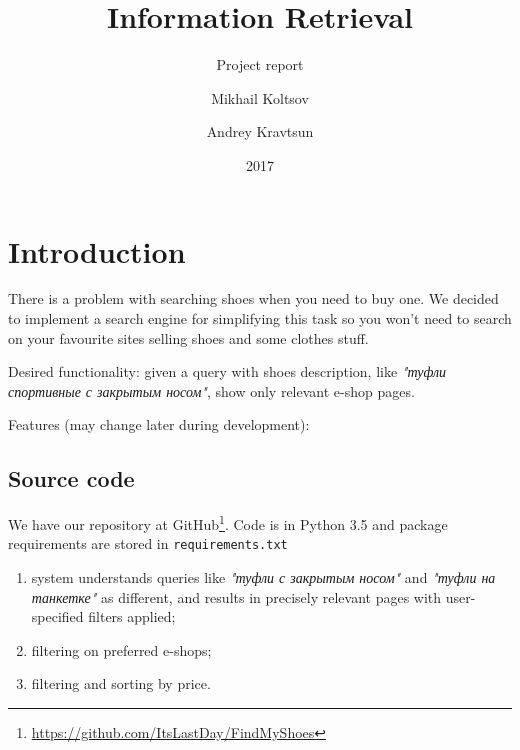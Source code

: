\documentclass[sigconf]{acmart}
\title{Information Retrieval}
\subtitle{Project report}
\author{Mikhail Koltsov}
\author{Andrey Kravtsun}
\date{2017}
\begin{document}
\maketitle

\section{Introduction}
There is a problem with searching shoes when you need to buy one. We decided to implement a search engine for sim\-pli\-fy\-ing this task so you won't need to search on your favourite sites selling shoes and some clothes stuff.

Desired functionality: given a query with shoes description, like \textit{"туфли спортивные с закрытым носом"}, show only re\-le\-vant e-shop pages.

Features (may change later during development):
\subsection{Source code}
    We have our repository at GitHub\footnote{\url{https://github.com/ItsLastDay/FindMyShoes}}. 
    Code is in Python 3.5 and package requirements are stored in \texttt{requirements.txt}
    
\begin{enumerate}
    \item system understands queries like \textit{"туфли с закрытым носом"} and \textit{"туфли на танкетке"} as different, and re\-sults in precisely relevant pages with user-specified fil\-ters applied;
    \item filtering on preferred e-shops;
    \item filtering and sorting by price.
\end{enumerate}





\medskip


 
\end{document}
